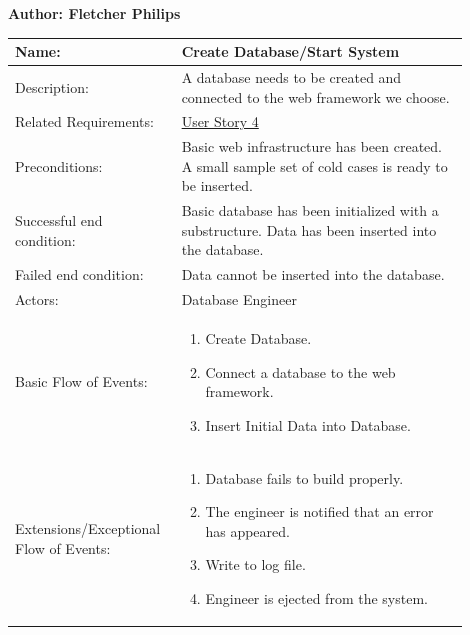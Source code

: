 \documentclass[11pt]{article}
\begin{document}
\begin{table}[!ht]
\begin{center}
\textbf{Author: Fletcher Philips}
\vspace*{1em}

\begin{tabular}{p{0.30\linewidth}p{0.60\linewidth}}
	Name: & Create Database/Start System\\\hline
	Description: & A database needs to be created and connected to the web framework we choose.\\\hline
	Related Requirements:& \hyperlink{us4}{User Story 4}\\\hline
	Preconditions:& Basic web infrastructure has been created. A small sample set of cold cases is ready to be inserted.\\\hline
	Successful end condition:& Basic database has been initialized with a substructure. Data has been inserted into the database.\\\hline
	Failed end condition:& Data cannot be inserted into the database.\\\hline
	Actors:& Database Engineer\\\hline
	Basic Flow of Events: & \begin{enumerate}
	\item Create Database.
	\item Connect a database to the web framework.
	\item Insert Initial Data into Database.
	\end{enumerate}\\\hline
	Extensions/Exceptional Flow of Events: & \begin{enumerate}
	\item Database fails to build properly.
	\item The engineer is notified that an error has appeared.
	\item Write to log file.
	\item Engineer is ejected from the system.
	\end{enumerate}
\end{tabular}
\label{des:create_database}	
\end{center}
\end{table}
\end{document}
